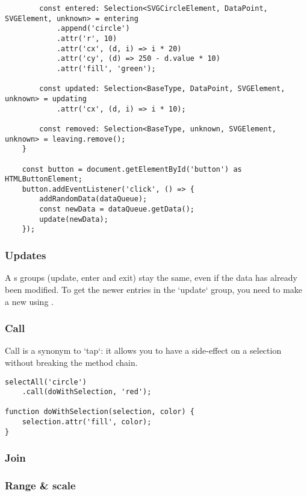 \begin{lstlisting}
        const entered: Selection<SVGCircleElement, DataPoint, SVGElement, unknown> = entering
            .append('circle')
            .attr('r', 10)
            .attr('cx', (d, i) => i * 20)
            .attr('cy', (d) => 250 - d.value * 10)
            .attr('fill', 'green');
    
        const updated: Selection<BaseType, DataPoint, SVGElement, unknown> = updating
            .attr('cx', (d, i) => i * 10);
        
        const removed: Selection<BaseType, unknown, SVGElement, unknown> = leaving.remove();
    }
    
    const button = document.getElementById('button') as HTMLButtonElement;
    button.addEventListener('click', () => {
        addRandomData(dataQueue);
        const newData = dataQueue.getData();
        update(newData);
    }); 
\end{lstlisting}

\subsubsection{Updates}
A s groups (update, enter and exit) stay the same, even if the data has already been modified.
To get the newer entries in the `update` group, you need to make a new  using .

\subsubsection{Call}
Call is a synonym to `tap`: it allows you to have a side-effect on a selection without breaking the method chain.

\begin{lstlisting}
selectAll('circle')
    .call(doWithSelection, 'red');

function doWithSelection(selection, color) {
    selection.attr('fill', color);
}
\end{lstlisting}

\subsubsection{Join}


\subsubsection{Range \& scale}



